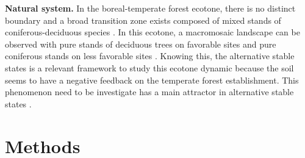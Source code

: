
\textbf{Natural system.} In the boreal-temperate forest ecotone, there is no
distinct boundary and a broad transition zone exists composed of mixed stands
of coniferous-deciduous species \cite{Goldblum2010}. In this ecotone, a macromosaic landscape can be observed with pure stands of deciduous trees on favorable sites and pure coniferous stands on less favorable sites
\cite{Goldblum2010}. Knowing this, the alternative stable states is a relevant
framework to study this ecotone dynamic because the soil seems to have a
negative feedback on the temperate forest establishment. This phenomenon need
to be investigate has a main attractor in alternative stable states
\cite{Kellman2004,Moore2008,DeFrenne2013,Barras1998}. 




\section{Methods}   

